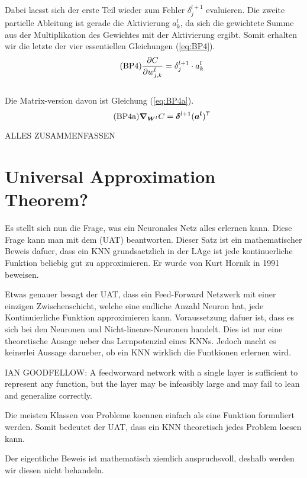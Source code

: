 \\
Dabei laesst sich der erste Teil wieder zum Fehler $\delta_j^{l+1}$ evaluieren.
Die zweite partielle Ableitung ist gerade die Aktivierung $a_k^l$, da sich die
gewichtete Summe aus der Multiplikation des Gewichtes mit der Aktivierung ergibt.
Somit erhalten wir die letzte der vier essentiellen Gleichungen (\ref{eq:BP4}).
\begin{equation}\tag{BP4}\label{eq:BP4}
  \frac{\partial C}{\partial w_{j,k}^l} = \delta_j^{l+1} \cdot a_k^l
\end{equation}
\\
Die Matrix-version davon ist Gleichung (\ref{eq:BP4a}).
\begin{equation}\tag{BP4a}\label{eq:BP4a}
  \bm{\nabla}_{\bm{W}^l} C = \bm{\delta}^{l+1} (\bm{a^l})^{\mathsf{T}}
\end{equation}

ALLES ZUSAMMENFASSEN

\cite{Nielsen}


\section{Universal Approximation Theorem?}\label{sec:UAT}
Es stellt sich nun die Frage, was ein Neuronales Netz alles erlernen kann.
Diese Frage kann man mit dem  (UAT)
beantworten. Dieser Satz ist ein mathematischer Beweis dafuer, dass ein KNN
grundsaetzlich in der LAge ist jede kontinuerliche Funktion beliebig gut zu
approximieren. Er wurde von Kurt Hornik in 1991 beweisen.

Etwas genauer besagt der UAT, dass ein Feed-Forward Netzwerk mit einer einzigen
Zwischenschicht, welche eine endliche Anzahl Neuron hat, jede Kontinuierliche
Funktion approximieren kann. Voraussetzung dafuer ist, dass es sich bei den
Neuronen und Nicht-lineare-Neuronen handelt. Dies ist nur eine theoretische
Ausage ueber das Lernpotenzial eines KNNs. Jedoch macht es keinerlei Aussage
darueber, ob ein KNN wirklich die Funtkionen erlernen wird.

IAN GOODFELLOW:
A feedworward network with a single layer is sufficient to represent any
function, but the layer may be infeasibly large and may fail to lean and
generalize correctly.

Die meisten Klassen von Probleme koennen einfach als eine Funktion formuliert
werden. Somit bedeutet der UAT, dass ein KNN theoretisch jedes Problem loesen kann.

Der eigentliche Beweis ist mathematisch ziemlich anspruchsvoll, deshalb werden
wir diesen nicht behandeln.


